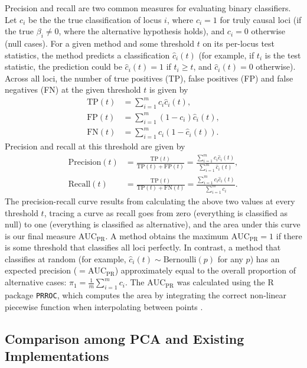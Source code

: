 \documentclass[12pt]{article}
\newcommand{\auc}{\text{AUC}_\text{PR}}
\begin{document}
Precision and recall are two common measures for evaluating binary classifiers.
Let $c_i$ be the the true classification of locus $i$, where $c_i = 1$ for truly causal loci (if the true $\beta_i \ne 0$, where the alternative hypothesis holds), and $c_i = 0$ otherwise (null cases).
For a given method and some threshold $t$ on its per-locus test statistics, the method predicts a classification $\hat{c}_i(t)$ (for example, if $t_i$ is the test statistic, the prediction could be $\hat{c}_i(t) = 1$ if $t_i \ge t$, and $\hat{c}_i(t) = 0$ otherwise).
Across all loci, the number of true positives (TP), false positives (FP) and false negatives (FN) at the given threshold $t$ is given by
\begin{align*}
  \text{TP}(t)
  &=
    \sum_{i = 1}^m c_i \hat{c}_i(t)
    , \\
  \text{FP}(t)
  &=
    \sum_{i = 1}^m (1 - c_i) \hat{c}_i(t)
    , \\
  \text{FN}(t)
  &=
    \sum_{i = 1}^m c_i \left( 1 - \hat{c}_i(t) \right)
    .
\end{align*}
Precision and recall at this threshold are given by
\begin{align*}
  \text{Precision}(t)
  &=
    \frac{ \text{TP}(t) }{ \text{TP}(t) + \text{FP}(t) }
    =
    \frac{ \sum_{i = 1}^m c_i \hat{c}_i(t) }{ \sum_{i = 1}^m \hat{c}_i(t) }
    , \\
  \text{Recall}(t)
  &=
    \frac{ \text{TP}(t) }{ \text{TP}(t) + \text{FN}(t) }
    =
    \frac{ \sum_{i = 1}^m c_i \hat{c}_i(t) }{ \sum_{i = 1}^m c_i }
    .
\end{align*}
The precision-recall curve results from calculating the above two values at every threshold $t$, tracing a curve as recall goes from zero (everything is classified as null) to one (everything is classified as alternative), and the area under this curve is our final measure $\auc$.
A method obtains the maximum $\auc = 1$ if there is some threshold that classifies all loci perfectly.
In contrast, a method that classifies at random (for example, $\hat{c}_i(t) \sim \text{Bernoulli}(p)$ for any $p$) has an expected precision ($= \auc$) approximately equal to the overall proportion of alternative cases:
$\pi_1 = \frac{1}{m} \sum_{i = 1}^m c_i$.
The $\auc$ was calculated using the R package \texttt{PRROC}, which computes the area by integrating the correct non-linear piecewise function when interpolating between points \citep{grau_prroc:_2015}.

\subsection{Comparison among PCA and Existing Implementations }
\end{document}
